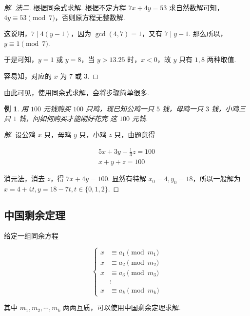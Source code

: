 \documentclass[a4paper]{article}
\newtheorem{exam}{例}[subsection]
\begin{document}
\begin{proof}[解. 法二]
    根据同余式求解. 根据不定方程 $7x+4y=53$ 求自然数解可知，$4y\equiv 53 \pmod 7$，否则原方程无整数解.

    这说明，$7\mid 4(y-1)$，因为 $\gcd(4,7)=1$，又有 $7\mid y-1$. 那么所以，$y\equiv 1\pmod 7$.

    于是可知，$y=1$ 或 $y=8$，当 $y>13.25$ 时，$x<0$，故 $y$ 只有 $1,8$ 两种取值.

    容易知，对应的 $x$ 为 $7$ 或 $3$.
\end{proof}

由此可见，使用同余式求解，会将步骤简单很多.

\begin{exam}
    用 $100$ 元钱购买 $100$ 只鸡，现已知公鸡一只 $5$ 钱，母鸡一只 $3$ 钱，小鸡三只 $1$ 钱，问如何购买才能刚好花完
    这 $100$ 元钱.
\end{exam}

\begin{proof}[解]
    设公鸡 $x$ 只，母鸡 $y$ 只，小鸡 $z$ 只，由题意得

    \begin{align*}
        5x+3y+\frac{1}{3}z=100 \\
        x+y+z=100
    \end{align*}

    消元法，消去 $z$，得 $7x+4y=100$. 显然有特解 $x_0=4,y_0=18$，所以一般解为 $x=4+4t,y=18-7t,t\in\{0,1,2\}$.
\end{proof}

\subsection{中国剩余定理}

给定一组同余方程

\begin{equation}
    \begin{cases}
        x & \equiv a_1\pmod {m_1} \\
        x & \equiv a_2\pmod {m_2} \\
        x & \equiv a_3\pmod {m_3} \\
          & \vdots                \\
        x & \equiv a_k\pmod {m_k}
    \end{cases}
\end{equation}

其中 $m_1,m_2,\cdots,m_k$ 两两互质，可以使用中国剩余定理求解.
\end{document}
